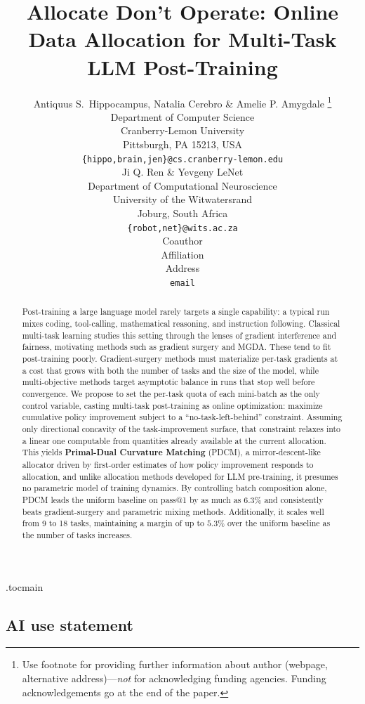 \documentclass{article} %
\title{Allocate Don't Operate: Online Data Allocation for Multi-Task LLM Post-Training}
\author{Antiquus S.~Hippocampus, Natalia Cerebro \& Amelie P. Amygdale \thanks{ Use footnote for providing further information
about author (webpage, alternative address)---\emph{not} for acknowledging
funding agencies.  Funding acknowledgements go at the end of the paper.} \\
Department of Computer Science\\
Cranberry-Lemon University\\
Pittsburgh, PA 15213, USA \\
\texttt{\{hippo,brain,jen\}@cs.cranberry-lemon.edu} \\
\And
Ji Q. Ren \& Yevgeny LeNet \\
Department of Computational Neuroscience \\
University of the Witwatersrand \\
Joburg, South Africa \\
\texttt{\{robot,net\}@wits.ac.za} \\
\AND
Coauthor \\
Affiliation \\
Address \\
\texttt{email}
}
\begin{document}
\maketitle

\begin{abstract}
Post-training a large language model rarely targets a single capability: a typical run mixes
coding, tool-calling, mathematical reasoning, and instruction following. Classical multi-task
learning studies this setting through the lenses of gradient interference and fairness,
motivating methods such as gradient surgery and MGDA. These tend to fit post-training poorly.
Gradient-surgery methods must materialize per-task gradients at a cost that grows with both the
number of tasks and the size of the model, while multi-objective methods target asymptotic
balance in runs that stop well before convergence. We propose to set the per-task quota of each
mini-batch as the only control variable, casting multi-task post-training as online
optimization: maximize cumulative policy improvement subject to a ``no-task-left-behind''
constraint. Assuming only directional concavity of the task-improvement surface, that
constraint relaxes into a linear one computable from quantities already available at the
current allocation. This yields \textbf{Primal-Dual Curvature Matching} (PDCM), a
mirror-descent-like allocator driven by first-order estimates of how policy improvement
responds to allocation, and unlike allocation methods developed for LLM pre-training, it
presumes no parametric model of training dynamics. By controlling batch composition alone, PDCM
leads the uniform baseline on pass@1 by as much as $6.3\%$ and consistently beats gradient-surgery and parametric mixing methods. 
Additionally, it scales well from 9 to 18 tasks, maintaining a margin of up to $5.3\%$ over the uniform baseline as the number of tasks increases.
\end{abstract}

\etocdepthtag.toc{main}










\subsection*{AI use statement}
\end{document}
